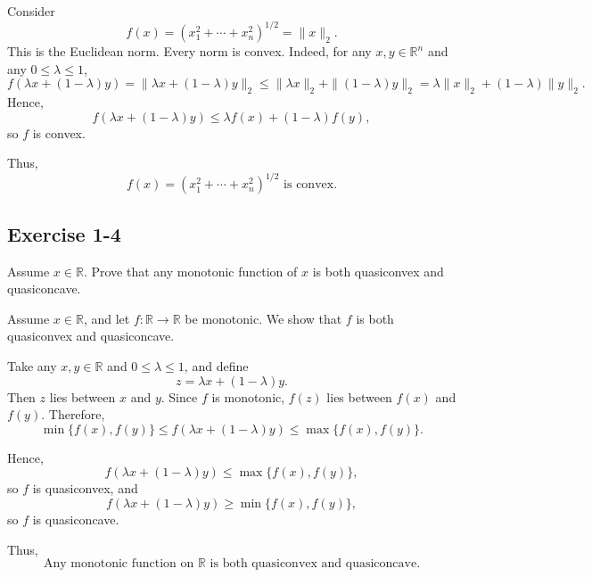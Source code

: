 Consider
\[
f(x)=\left(x_1^2+\cdots+x_n^2\right)^{1/2}=\|x\|_2.
\]
This is the Euclidean norm. Every norm is convex. Indeed, for any \(x,y\in\mathbb{R}^n\) and any \(0\le \lambda \le 1\),
\[
f(\lambda x+(1-\lambda)y)
=
\|\lambda x+(1-\lambda)y\|_2
\le
\|\lambda x\|_2+\|(1-\lambda)y\|_2
=
\lambda \|x\|_2+(1-\lambda)\|y\|_2.
\]
Hence,
\[
f(\lambda x+(1-\lambda)y)\le \lambda f(x)+(1-\lambda)f(y),
\]
so \(f\) is convex.

Thus,
\[
\boxed{
f(x)=\left(x_1^2+\cdots+x_n^2\right)^{1/2}
\text{ is convex.}}
\]





\vspace{30pt}
\begin{tcolorbox}[breakable]

\subsection*{Exercise 1-4}

Assume $x \in \mathbb{R}$. Prove that any monotonic function of $x$
is both quasiconvex and quasiconcave.


\end{tcolorbox}


Assume \(x\in \mathbb{R}\), and let \(f:\mathbb{R}\to\mathbb{R}\) be monotonic.  
We show that \(f\) is both quasiconvex and quasiconcave.

Take any \(x,y\in\mathbb{R}\) and \(0\le \lambda \le 1\), and define
\[
z=\lambda x+(1-\lambda)y.
\]
Then \(z\) lies between \(x\) and \(y\). Since \(f\) is monotonic, \(f(z)\) lies between \(f(x)\) and \(f(y)\). Therefore,
\[
\min\{f(x),f(y)\}\le f(\lambda x+(1-\lambda)y)\le \max\{f(x),f(y)\}.
\]

Hence,
\[
f(\lambda x+(1-\lambda)y)\le \max\{f(x),f(y)\},
\]
so \(f\) is quasiconvex, and
\[
f(\lambda x+(1-\lambda)y)\ge \min\{f(x),f(y)\},
\]
so \(f\) is quasiconcave.

Thus,
\[
\boxed{\text{Any monotonic function on } \mathbb{R} \text{ is both quasiconvex and quasiconcave.}}
\]





